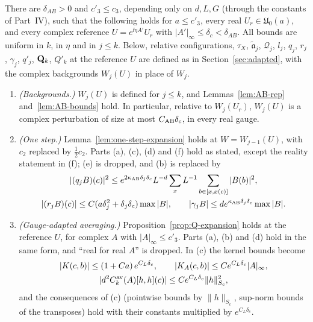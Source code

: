 \begin{proposition}\label{prop:AB}
There are $\delta_{AB}>0$ and $c'_3\le c_3$, depending only on $d,L,G$ (through the constants of Part~IV), such that the following holds for $a\le c'_3$, every real $U_r\in\mathfrak U_0(a)$, and every complex reference $U=e^{\ii\eta A'}U_r$ with $|A'|_\infty\le\delta_c<\delta_{AB}$. All bounds are uniform in $k$, in $\eta$ and in $j\le k$. Below, relative configurations, $\tau_X$, $\tilde{\mathfrak a}_j$, $\mathcal Q_j$, $l_j$, $q_j$, $r_j$, $\gamma_j$, $q'_j$, $\mathbf Q_k$, $Q'_k$ at the reference $U$ are defined as in Section~\ref{sec:adapted}, with the complex backgrounds $W_j(U)$ in place of $W_j$.
\begin{enumerate}[label=(\roman*)]
\item \emph{(Backgrounds.)} $W_j(U)$ is defined for $j\le k$, and Lemmas~\ref{lem:AB-rep} and~\ref{lem:AB-bounds} hold. In particular, relative to $W_j(U_r)$, $W_j(U)$ is a complex perturbation of size at most $C_{\rm AB}\delta_c$, in every real gauge.
\item \emph{(One step.)} Lemma~\ref{lem:one-step-expansion} holds at $W=W_{j-1}(U)$, with $c_2$ replaced by $\frac12c_2$. Parts (a), (c), (d) and (f) hold as stated, except the reality statement in (f); (e) is dropped, and (b) is replaced by
\begin{gather*}
|(q_jB)(c)|^2\le e^{2\kappa_{\rm AB}\delta_j\delta_c}L^{-d}\sum_xL^{-1}\sum_{b\in[x,x(c)]}|B(b)|^2,\\
|(r_jB)(c)|\le C(a\delta_j^2+\delta_j\delta_c)\max|B|,\qquad|\gamma_jB|\le de^{\kappa_{\rm AB}\delta_j\delta_c}\max|B| .
\end{gather*}
\item \emph{(Gauge-adapted averaging.)} Proposition~\ref{prop:Q-expansion} holds at the reference $U$, for complex $A$ with $|A|_\infty\le c'_3$. Parts (a), (b) and (d) hold in the same form, and ``real for real $A$'' is dropped. In (c) the kernel bounds become
\begin{gather*}
|K(c,b)|\le(1+Ca)\,e^{C_L\delta_c},\qquad|K_A(c,b)|\le Ce^{C_L\delta_c}|A|_\infty,\\
|d^2C^{\rm av}_k(A)[h,h](c)|\le Ce^{C_L\delta_c}\|h\|^2_{S_c},
\end{gather*}
and the consequences of (c) (pointwise bounds by $\|h\|_{S_c}$, sup-norm bounds of the transposes) hold with their constants multiplied by $e^{C_L\delta_c}$.

\end{enumerate}
\end{proposition}

